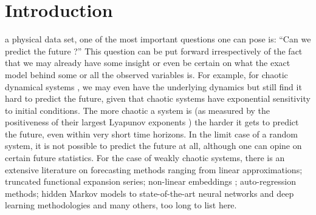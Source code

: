 \documentclass[journal]{IEEEtran}
\begin{document}
\section{Introduction}
%
%
%
%
 a physical data set, one of the most important questions one can pose is: ``Can we predict the future ?'' This 
question can be put forward irrespectively of the fact that we may already have some insight or even be certain on what the exact model 
behind some or all the observed variables is. For example, for chaotic dynamical systems \cite{0813340853,2004icti.book.....M}, we may 
even have the underlying dynamics but still find it hard to predict the future, given that chaotic systems have exponential sensitivity 
to initial conditions. The more chaotic a system is (as measured by the positiveness of their largest Lyapunov exponents 
\cite{1985PhyD...16..285W,1994PhLA..185...77K}) the harder it gets to predict the future, even within very short time horizons. In the 
limit case of a random system, it is not possible to predict the future at all, although one can opine on certain future 
statistics\cite{9780486693873}. For the case of weakly chaotic systems, there is an extensive literature on forecasting methods ranging 
from linear approximations\cite{1451722}; truncated functional expansion 
series\cite{Powell:1987:RBF:48424.48433,Broomhead1988MultivariableFI}; non-linear embeddings \cite{PhysRevLett.59.845}; auto-regression 
methods\cite{0130607746}; hidden Markov models \cite{1165342} to state-of-the-art neural networks and deep learning methodologies 
\cite{LANGKVIST201411} and many others, too long to list here.
\end{document}
